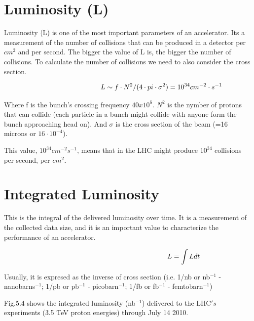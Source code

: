 \;
\;

\section{Luminosity (L)}


\noindent
Luminosity (L) is one of the most important parameters of an accelerator. Its a measurement of the number of collisions that can be produced in a detector per $cm^{2}$ and per second. The bigger the value of L is, the bigger the number of collisions. To calculate the number of collisions we need to also consider the cross section.

\begin{equation}\hspace{34 mm}L\sim f\cdot N^{2}/(4\cdot pi\cdot  \sigma ^{2}) = 10^{34} cm^{-2} \cdot s^{-1} \end{equation}

\;
\;

\noindent
Where f is the bunch's crossing frequency $40x10^{6}$. $N^{2}$ is the nymber of protons that can collide (each particle in a bunch might collide with anyone form the bunch approaching head on). And $\sigma$ is the cross section of the beam (=16 microns or $16\cdot 10^{-4}$).

\;
\;
\noindent
This value, $10^{34}cm^{-2}s^{-1}$, means that in the LHC might produce $10^{34}$ collisions per second, per $cm^{2}$. 

\;
\;

\section{Integrated Luminosity}

\noindent
This is the integral of the delivered luminosity over time. It is a measurement of the collected data size, and it is an important value to characterize the performance of an accelerator.

\begin{equation}\hspace{57 mm}L = \int L dt \end{equation}

\;
\;

\noindent
Usually, it is expresed as the inverse of cross section (i.e. 1/nb or nb$^{-1}$ - nanobarns$^{-1}$; 1/pb or pb$^{-1}$ - picobarn$^{-1}$; 1/fb or fb$^{-1}$ - femtobarn$^{-1}$)

\;
\;

\noindent Fig.5.4 shows the integrated luminosity (nb$^{-1}$) delivered to the LHC$'s$ experiments (3.5 TeV proton energies) through July 14 2010.

